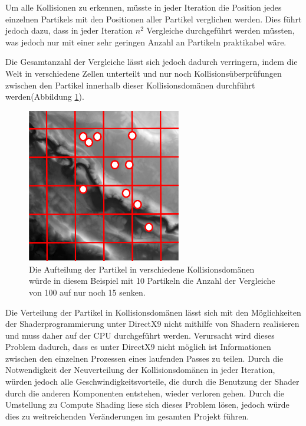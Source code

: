 \begin{Spacing}{\mylinespace}
		Um alle Kollisionen zu erkennen, müsste in jeder Iteration die Position
		jedes einzelnen Partikels mit den Positionen aller Partikel 
		verglichen werden. Dies führt jedoch dazu, dass in jeder Iteration $n^2$
		Vergleiche durchgeführt werden müssten, was jedoch nur mit einer sehr
		geringen Anzahl an Partikeln praktikabel wäre.
		
		Die Gesamtanzahl der Vergleiche lässt sich jedoch dadurch verringern, indem
		die Welt in verschiedene Zellen unterteilt und nur noch
		Kollisionsüberprüfungen zwischen den Partikel innerhalb dieser Kollisionsdomänen
		durchführt werden(Abbildung \ref{fig:partdom}).
		\begin{figure}[h!]
			\centering
			\vspace*{30px}
			\includegraphics[width=0.6\textwidth]{graphics/Phys_kp_domain.png}
			\caption{Die Aufteilung der Partikel in verschiedene Kollisionsdomänen würde in diesem Beispiel mit 10 Partikeln die Anzahl der Vergleiche von 100 auf nur noch 15 senken.}
			\label{fig:partdom}
		\end{figure}
		
		Die Verteilung der Partikel in Kollisionsdomänen lässt sich mit den
		Möglichkeiten der Shaderprogrammierung unter DirectX9 nicht mithilfe von
		Shadern realisieren und muss daher auf der CPU durchgeführt werden.
		Verursacht wird dieses Problem dadurch, dass es unter DirectX9 nicht
		möglich ist Informationen zwischen den einzelnen Prozessen eines
		laufenden Passes zu teilen.		
		Durch die Notwendigkeit der Neuverteilung der Kollisionsdomänen in jeder
		Iteration, würden jedoch alle Geschwindigkeitsvorteile, die durch die 
		Benutzung der Shader durch die anderen Komponenten entstehen, wieder
		verloren gehen.
		Durch die Umstellung zu Compute Shading liese sich dieses Problem lösen,
		jedoch würde dies zu weitreichenden Veränderungen im gesamten Projekt
		führen.
		

\end{Spacing}
